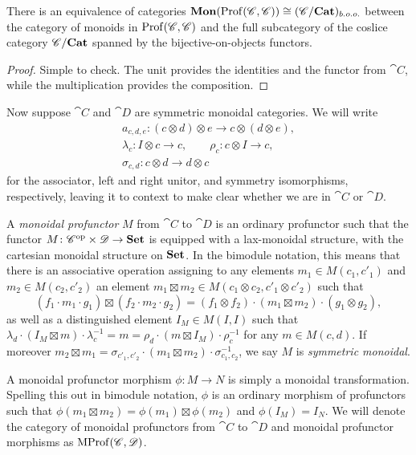 \documentclass[12pt,oneside,article,draft]{memoir}
\begin{document}
\begin{lemma}
	There is an equivalence of categories $\mathbf{Mon}(\operatorname{Prof}(\mathscr{C},\mathscr{C}))\cong (\mathscr{C}/\mathbf{Cat})_{b.o.o.}$ between the category of monoids in $\operatorname{Prof}(\mathscr{C},\mathscr{C})$ and the full subcategory of the coslice category $\mathscr{C}/\mathbf{Cat}$ spanned by the bijective-on-objects functors.
\end{lemma}
\begin{proof}
	Simple to check. The unit provides the identities and the functor from $\cat{C}$, while the multiplication provides the composition.
\end{proof}

Now suppose $\cat{C}$ and $\cat{D}$ are symmetric monoidal categories. We will write
\begin{gather*}
	a_{c,d,e}\colon (c\otimes d)\otimes e \to c\otimes(d\otimes e), \\
		\lambda_c\colon I\otimes c\to c,
		\qquad \rho_c\colon c\otimes I \to c, \\
		\sigma_{c,d}\colon c\otimes d\to d\otimes c
\end{gather*}
for the associator, left and right unitor, and symmetry isomorphisms, respectively, leaving it to context to make clear whether we are in $\cat{C}$ or $\cat{D}$.

A \emph{monoidal profunctor} $M$ from $\cat{C}$ to $\cat{D}$ is an ordinary profunctor such that the functor $M\colon {\mathscr{C}}^{\text{op}}\times\mathscr{D}\to\mathbf{Set}$ is equipped with a lax-monoidal structure, with the cartesian monoidal structure on $\mathbf{Set}$. In the bimodule notation, this means that there is an associative operation assigning to any elements $m_1\in M(c_1,c'_1)$ and $m_2\in M(c_2,c'_2)$ an element $m_1\boxtimes m_2\in M(c_1\otimes c_2,c'_1\otimes c'_2)$ such that
\[
	(f_1\cdot m_1\cdot g_1)\boxtimes(f_2\cdot m_2\cdot g_2) = (f_1\otimes f_2)\cdot(m_1\boxtimes m_2)\cdot(g_1\otimes g_2),
\]
as well as a distinguished element $I_M\in M(I,I)$ such that $\lambda_d\cdot(I_M\boxtimes m)\cdot\lambda^{-1}_c = m = \rho_d\cdot(m\boxtimes I_M)\cdot\rho^{-1}_c$ for any $m\in M(c,d)$. If moreover $m_2\boxtimes m_1 = \sigma_{c'_1,c'_2}\cdot(m_1\boxtimes m_2)\cdot\sigma_{c_1,c_2}^{-1}$, we say $M$ is \emph{symmetric monoidal}.

A monoidal profunctor morphism $\phi\colon M\to N$ is simply a monoidal transformation. Spelling this out in bimodule notation, $\phi$ is an ordinary morphism of profunctors such that $\phi(m_1\boxtimes m_2)=\phi(m_1)\boxtimes\phi(m_2)$ and $\phi(I_M)=I_N$. We will denote the category of monoidal profunctors from $\cat{C}$ to $\cat{D}$ and monoidal profunctor morphisms as $\operatorname{MProf}(\mathscr{C},\mathscr{D})$.
\end{document}
